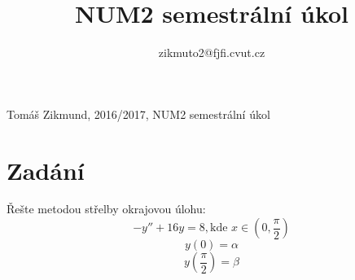 \documentclass[11pt, a4paper]{article}
\title{NUM2 semestrální úkol}
\author{zikmuto2@fjfi.cvut.cz}
\begin{document}
Tomáš Zikmund,  2016/2017, NUM2 semestrální úkol

\section{Zadání}
Řešte metodou střelby okrajovou úlohu:
\[ -y'' + 16 y = 8, \mbox{kde~} x \in (0,\frac{\pi}{2}) \]
\[ y(0) = \alpha\]
\[ y(\frac{\pi}{2}) = \beta \]
\end{document}
